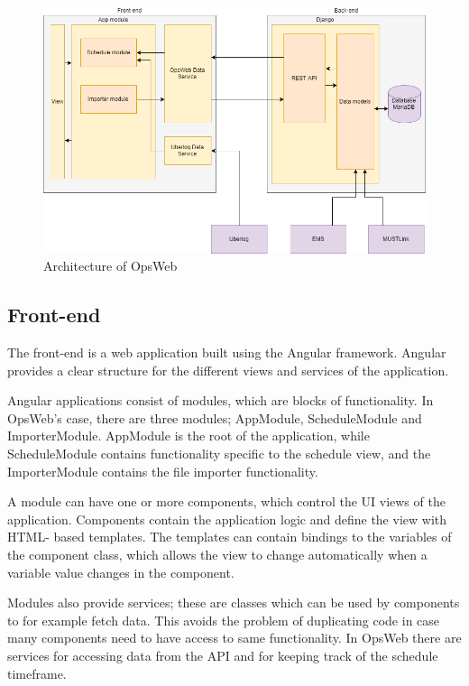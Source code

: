 \begin{figure}[ht]
  \begin{center}
    \includegraphics*[width=1\textwidth]{Architecture}
  \end{center}
  \caption{Architecture of OpsWeb}
  \label{fig:architecture_diagram}
\end{figure}

\subsection{Front-end}
The front-end is a web application built using the Angular framework. \cite{angular} Angular provides a clear structure for the different views and services of the application.

Angular applications consist of modules, which are blocks of functionality. In OpsWeb's case, there are three modules; AppModule, ScheduleModule and ImporterModule. AppModule is the root of the application, while ScheduleModule contains functionality specific to the schedule view, and the ImporterModule contains the file importer functionality.

A module can have one or more components, which control the UI views of the application. Components contain the application logic and define the view with HTML- based templates. The templates can contain bindings to the variables of the component class, which allows the view to change automatically when a variable value changes in the component.

Modules also provide services; these are classes which can be used by components to for example fetch data. This avoids the problem of duplicating code in case many components need to have access to same functionality. In OpsWeb there are services for accessing data from the API and for keeping track of the schedule timeframe.

